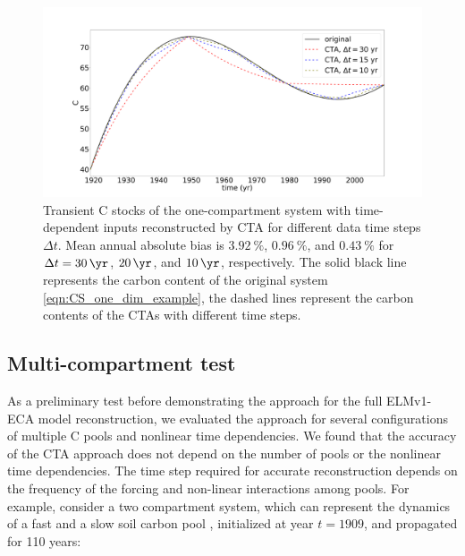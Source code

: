 \documentclass[draft]{agujournal2019}
\begin{document}
\begin{figure}[htbp]
    \centering 
    \includegraphics[width=1.0\linewidth]{figs/interpol_pwc_1.pdf}
    \caption{Transient C stocks of the one-compartment system with time-dependent inputs reconstructed by CTA for different data time steps $\Delta t$.
    Mean annual absolute bias is $\SI{3.92}{\percent}$, $\SI{0.96}{\percent}$, and $\SI{0.43}{\percent}$ for $\Delta{t} = \SI{30}{\yr}$, $\SI{20}{\yr}$, and $\SI{10}{\yr}$, respectively.
    The solid black line represents the carbon content of the original system \eqref{eqn:CS_one_dim_example}, the dashed lines represent the carbon contents of the CTAs with different time steps.}    
    \label{fig:CS_one_dim_example}
\end{figure}        


\subsection{Multi-compartment test}
    As a preliminary test before demonstrating the approach for the full ELMv1-ECA model reconstruction, we evaluated the approach for several configurations of multiple C pools and nonlinear time dependencies. We found that the accuracy of the CTA approach does not depend on the number of pools or the nonlinear time dependencies. The time step required for accurate reconstruction depends on the frequency of the forcing and non-linear interactions among pools. For example, consider a two compartment system, which can represent the dynamics of a fast and a slow soil carbon pool \cite{Andren1997}, initialized at year $t=1909$, and propagated for 110 years:
    
\end{document}
